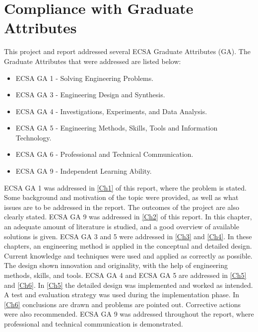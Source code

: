 \section{Compliance with Graduate Attributes}
This project and report addressed several ECSA Graduate Attributes (GA). The Graduate Attributes that were addressed are listed below:
\begin{itemize}[noitemsep]
    \item ECSA GA 1 - Solving Engineering Problems.
    \item ECSA GA 3 - Engineering Design and Synthesis.
    \item ECSA GA 4 - Investigations, Experiments, and Data Analysis.
    \item ECSA GA 5 - Engineering Methods, Skills, Tools and Information Technology.
    \item ECSA GA 6 - Professional and Technical Communication.
    \item ECSA GA 9 - Independent Learning Ability.
\end{itemize}
\noindent
ECSA GA 1 was addressed in \autoref{Ch1} of this report, where the problem is stated. Some background and motivation of the topic were provided, as well as what issues are to be addressed in the report. The outcomes of the project are also clearly stated. ECSA GA 9 was addressed in \autoref{Ch2} of this report. In this chapter, an adequate amount of literature is studied, and a good overview of available solutions is given. ECSA GA 3 and 5 were addressed in \autoref{Ch3} and \autoref{Ch4}. In these chapters, an engineering method is applied in the conceptual and detailed design. Current knowledge and techniques were used and applied as correctly as possible. The design shown innovation and originality, with the help of engineering methods, skills, and tools. ECSA GA 4 and ECSA GA 5 are addressed in \autoref{Ch5} and \autoref{Ch6}. In \autoref{Ch5} the detailed design was implemented and worked as intended. A test and evaluation strategy was used during the implementation phase. In \autoref{Ch6} conclusions are drawn and problems are pointed out. Corrective actions were also recommended. ECSA GA 9 was addressed throughout the report, where professional and technical communication is demonstrated. 